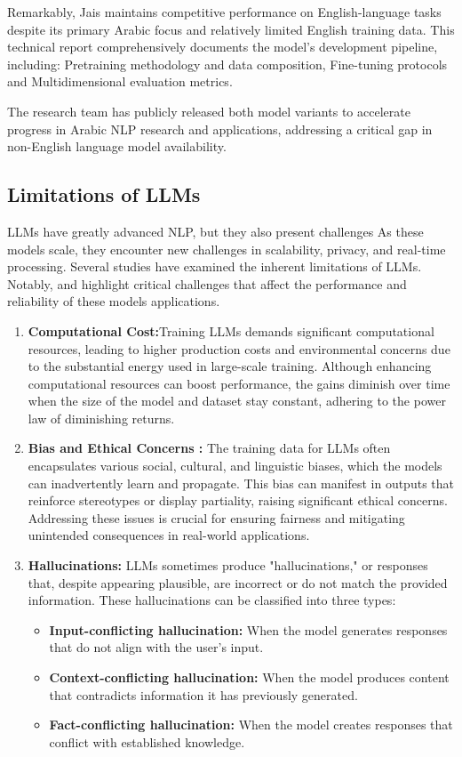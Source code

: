 Remarkably, Jais maintains competitive performance on English-language tasks despite its primary Arabic focus and relatively limited English training data. This technical report comprehensively documents the model's development pipeline, including: Pretraining methodology and data composition,
Fine-tuning protocols and Multidimensional evaluation metrics.

The research team has publicly released both model variants to accelerate progress in Arabic NLP research and applications, addressing a critical gap in non-English language model availability.

\subsection{Limitations of LLMs}
LLMs have greatly advanced NLP, but they also present challenges As these models scale, they encounter new challenges in scalability, privacy, and real-time processing. Several studies have examined the inherent limitations of LLMs. Notably, \citep{Bender2021} and \citep{Naveed2023} highlight critical challenges that affect the performance and reliability of these models applications.
\begin{enumerate}
	\item \textbf{Computational Cost:}Training LLMs demands significant computational resources, leading to higher production costs and environmental concerns due to the substantial energy used in large-scale training. Although enhancing computational resources can boost performance, the gains diminish over time when the size of the model and dataset stay constant, adhering to the power law of diminishing returns.
	\item \textbf{Bias and Ethical Concerns :} The training data for LLMs often encapsulates various social, cultural, and linguistic biases, which the models can inadvertently learn and propagate. This bias can manifest in outputs that reinforce stereotypes or display partiality, raising significant ethical concerns. Addressing these issues is crucial for ensuring fairness and mitigating unintended consequences in real-world applications.
	\item \textbf{Hallucinations:} LLMs sometimes produce "hallucinations," or responses that, despite appearing plausible, are incorrect or do not match the provided information. These hallucinations can be classified into three types:
	     \begin{itemize}
		\item \textbf{Input-conflicting hallucination:} When the model generates responses that do not align with the user's input.
		\item \textbf{Context-conflicting hallucination:} When the model produces content that contradicts information it has previously generated.
		\item \textbf{Fact-conflicting hallucination:} When the model creates responses that conflict with established knowledge.
		\end{itemize}

\end{enumerate}
